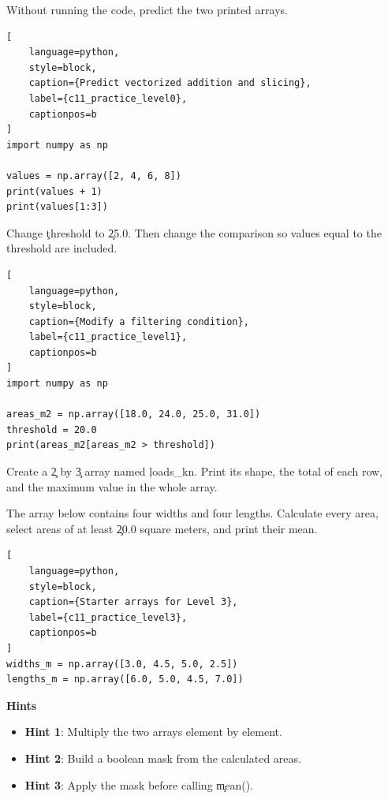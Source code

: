 

Without running the code, predict the two printed arrays.

\begin{lstlisting}[
    language=python,
    style=block,
    caption={Predict vectorized addition and slicing},
    label={c11_practice_level0},
    captionpos=b
]
import numpy as np

values = np.array([2, 4, 6, 8])
print(values + 1)
print(values[1:3])
\end{lstlisting}


Change \c{threshold} to \c{25.0}. Then change the comparison so values equal to
the threshold are included.

\begin{lstlisting}[
    language=python,
    style=block,
    caption={Modify a filtering condition},
    label={c11_practice_level1},
    captionpos=b
]
import numpy as np

areas_m2 = np.array([18.0, 24.0, 25.0, 31.0])
threshold = 20.0
print(areas_m2[areas_m2 > threshold])
\end{lstlisting}


Create a \c{2} by \c{3} array named \c{loads_kn}. Print its shape, the total
of each row, and the maximum value in the whole array.


The array below contains four widths and four lengths. Calculate every area,
select areas of at least \c{20.0} square meters, and print their mean.

\begin{lstlisting}[
    language=python,
    style=block,
    caption={Starter arrays for Level 3},
    label={c11_practice_level3},
    captionpos=b
]
widths_m = np.array([3.0, 4.5, 5.0, 2.5])
lengths_m = np.array([6.0, 5.0, 4.5, 7.0])
\end{lstlisting}

\textbf{Hints}
\begin{itemize}
    \item \textbf{Hint 1}: Multiply the two arrays element by element.
    \item \textbf{Hint 2}: Build a boolean mask from the calculated areas.
    \item \textbf{Hint 3}: Apply the mask before calling \c{mean()}.
\end{itemize}

